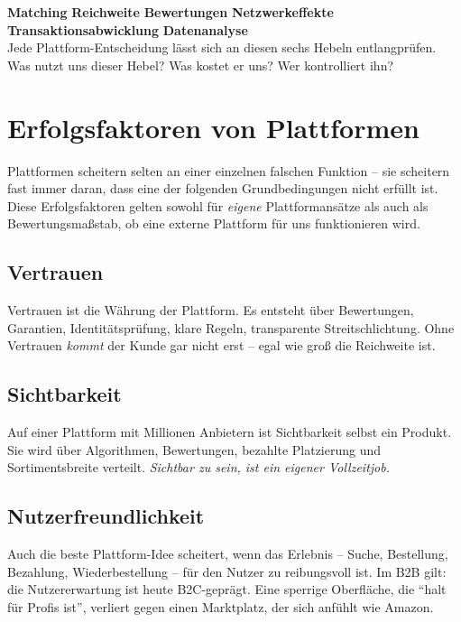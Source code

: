 \documentclass[11pt,a4paper,oneside]{article}
\begin{document}
\begin{merkbox}
\textbf{Matching} \textperiodcentered{} \textbf{Reichweite} \textperiodcentered{} \textbf{Bewertungen} \textperiodcentered{} \textbf{Netzwerkeffekte} \textperiodcentered{} \textbf{Transaktionsabwicklung} \textperiodcentered{} \textbf{Datenanalyse}\\[2pt]
Jede Plattform-Entscheidung lässt sich an diesen sechs Hebeln entlangprüfen. Was nutzt uns dieser Hebel? Was kostet er uns? Wer kontrolliert ihn?
\end{merkbox}

\section{Erfolgsfaktoren von Plattformen}

Plattformen scheitern selten an einer einzelnen falschen Funktion -- sie scheitern fast immer daran, dass eine der folgenden Grundbedingungen nicht erfüllt ist. Diese Erfolgsfaktoren gelten sowohl für \emph{eigene} Plattformansätze als auch als Bewertungsmaßstab, ob eine externe Plattform für uns funktionieren wird.

\subsection{Vertrauen}

Vertrauen ist die Währung der Plattform. Es entsteht über Bewertungen, Garantien, Identitätsprüfung, klare Regeln, transparente Streitschlichtung. Ohne Vertrauen \emph{kommt} der Kunde gar nicht erst -- egal wie groß die Reichweite ist.

\subsection{Sichtbarkeit}

Auf einer Plattform mit Millionen Anbietern ist Sichtbarkeit selbst ein Produkt. Sie wird über Algorithmen, Bewertungen, bezahlte Platzierung und Sortimentsbreite verteilt. \emph{Sichtbar zu sein, ist ein eigener Vollzeitjob.}

\subsection{Nutzerfreundlichkeit}

Auch die beste Plattform-Idee scheitert, wenn das Erlebnis -- Suche, Bestellung, Bezahlung, Wiederbestellung -- für den Nutzer zu reibungsvoll ist. Im B2B gilt: die Nutzererwartung ist heute B2C-geprägt. Eine sperrige Oberfläche, die ``halt für Profis ist'', verliert gegen einen Marktplatz, der sich anfühlt wie Amazon.
\end{document}
